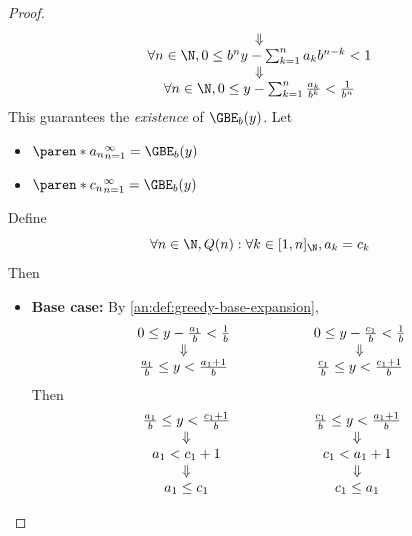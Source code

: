 \begin{proof}
\[\begin{array}{c}
      \Downarrow                                                                            \\
      \forall n \in \N, 0 \leq b^{n}y - \sum_{k = 1}^{n} a_{k}b^{n - k} < 1                 \\
      \Downarrow                                                                            \\
      \forall n \in \N, 0 \leq y - \sum_{k = 1}^{n} \frac{a_{k}}{b^{k}} < \frac{1}{b^{n}}
    \end{array}
  \]
  This guarantees the \emph{existence} of $\GBE_{b}(y)$. Let
  \begin{itemize}
    \item $\paren*{a_{n}}_{n = 1}^{\infty} = \GBE_{b}(y)$
    \item $\paren*{c_{n}}_{n = 1}^{\infty} = \GBE_{b}(y)$
  \end{itemize}
  Define
  \[
    \forall n \in \N, Q(n): \forall k \in [1, n]_{\N}, a_{k} = c_{k}
  \]
  Then
  \begin{itemize}
    \item \textbf{Base case:} By \cref{an:def:greedy-base-expansion},
          \[
            \begin{array}{c@{\qquad\qquad\qquad}c}
              0 \leq y - \frac{a_{1}}{b} < \frac{1}{b}     & 0 \leq y - \frac{c_{1}}{b} < \frac{1}{b}     \\
              \Downarrow                                   & \Downarrow                                   \\
              \frac{a_{1}}{b} \leq y < \frac{a_{1} + 1}{b} & \frac{c_{1}}{b} \leq y < \frac{c_{1} + 1}{b}
            \end{array}
          \]
          Then
          \[
            \begin{array}{c@{\qquad\qquad\qquad}c}
              \frac{a_{1}}{b} \leq y < \frac{c_{1} + 1}{b} & \frac{c_{1}}{b} \leq y < \frac{a_{1} + 1}{b} \\
              \Downarrow                                   & \Downarrow                                   \\
              a_{1} < c_{1} + 1                            & c_{1} < a_{1} + 1                            \\
              \Downarrow                                   & \Downarrow                                   \\
              a_{1} \leq c_{1}                             & c_{1} \leq a_{1}
            \end{array}
\]
\end{itemize}
\end{proof}
